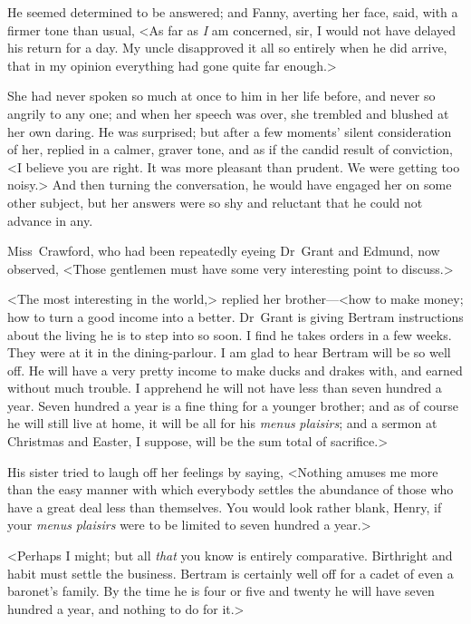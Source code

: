 He seemed determined to be answered; and Fanny, averting her face, said, with a firmer tone than usual, <As far as \textit{I}  am concerned, sir, I would not have delayed his return for a day. My uncle disapproved it all so entirely when he did arrive, that in my opinion everything had gone quite far enough.>

She had never spoken so much at once to him in her life before, and never so angrily to any one; and when her speech was over, she trembled and blushed at her own daring. He was surprised; but after a few moments' silent consideration of her, replied in a calmer, graver tone, and as if the candid result of conviction, <I believe you are right. It was more pleasant than prudent. We were getting too noisy.> And then turning the conversation, he would have engaged her on some other subject, but her answers were so shy and reluctant that he could not advance in any.

Miss~Crawford, who had been repeatedly eyeing Dr~Grant and Edmund, now observed, <Those gentlemen must have some very interesting point to discuss.>

<The most interesting in the world,> replied her brother—<how to make money; how to turn a good income into a better. Dr~Grant is giving Bertram instructions about the living he is to step into so soon. I find he takes orders in a few weeks. They were at it in the dining-parlour. I am glad to hear Bertram will be so well off. He will have a very pretty income to make ducks and drakes with, and earned without much trouble. I apprehend he will not have less than seven hundred a year. Seven hundred a year is a fine thing for a younger brother; and as of course he will still live at home, it will be all for his \textit{menus}  \textit{plaisirs}; and a sermon at Christmas and Easter, I suppose, will be the sum total of sacrifice.>

His sister tried to laugh off her feelings by saying, <Nothing amuses me more than the easy manner with which everybody settles the abundance of those who have a great deal less than themselves. You would look rather blank, Henry, if your \textit{menus}  \textit{plaisirs}  were to be limited to seven hundred a year.>

<Perhaps I might; but all \textit{that}  you know is entirely comparative. Birthright and habit must settle the business. Bertram is certainly well off for a cadet of even a baronet's family. By the time he is four or five and twenty he will have seven hundred a year, and nothing to do for it.>


